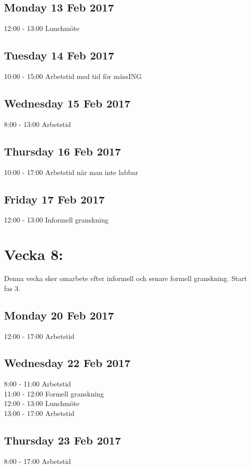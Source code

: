 \documentclass[paper=a4, fontsize=11pt,twoside]{article}
\begin{document}
\subsection*{Monday 13 Feb 2017}
	12:00 - 13:00 Lunchmöte\\
\subsection*{Tuesday 14 Feb 2017}
	10:00 - 15:00 Arbetstid med tid för mässING\\
\subsection*{Wednesday 15 Feb 2017}
	8:00 - 13:00 Arbetstid\\
\subsection*{Thursday 16 Feb 2017}
	10:00 - 17:00 Arbetstid när man inte labbar\\
\subsection*{Friday 17 Feb 2017}
	12:00 - 13:00 Informell granskning\\



\section*{Vecka 8:}
Denna vecka sker omarbete efter informell och senare formell granskning. Start
fas 3.\\
 \subsection*{Monday 20 Feb 2017}
	12:00 - 17:00 Arbetstid\\
\subsection*{Wednesday 22 Feb 2017}
	8:00 - 11:00 Arbetstid\\
	11:00 - 12:00 Formell granskning\\
	12:00 - 13:00 Lunchmöte\\
	13:00 - 17:00 Arbetstid\\
\subsection*{Thursday 23 Feb 2017}
	8:00 - 17:00 Arbetstid\\
\end{document}
